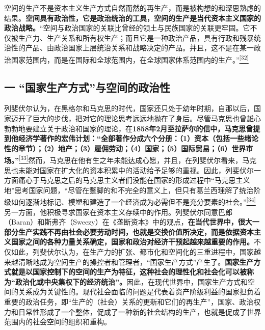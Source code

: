 \documentclass[UTF8, fontset = sourcesans, a4paper, oneside, zihao =
-4, scheme=chinese, no-math, space=true]{ctexbook}
\begin{document}
空间的生产不是资本主义生产方式自然而然的再生产，而是被构想的和深思熟虑的结果。\textbf{空间具有政治性，它是政治统治的工具，空间的生产是当代资本主义国家的政治战略。}``空间与政治国家的关联比曾经的领土与民族国家的关联更牢固。它不仅被生产力、生产关系和所有权生产；而且它是一种政治产品，具有行政和残暴统治性的产品、由政治国家上层统治关系和战略决定的产品。并且，这不是在某一政治国家范围内，而是在国际和全球范围内，在全球国家体系范围内的生产。''\protect\hypertarget{part0007_split_002.htmlux5cux23w32}{}{}\protect\hyperlink{part0007_split_004.htmlux5cux23m32}{\textsuperscript{{[}32{]}}}

\subsection{\texorpdfstring{一
``国家生产方式''与空间的政治性}{一 国家生产方式与空间的政治性}}\label{part0007_split_002.htmlux5cux23c028}

列斐伏尔认为，在黑格尔和马克思的时代，国家还只处于幼年时期，自那以后，国家迈开了巨大的步伐，把对它的理论思考远远地抛在了身后。尽管马克思也曾雄心勃勃地要建立关于政治和国家的理论，在\textbf{1858年2月至拉萨尔的信中，马克思曾提到他经济学著作的宏伟计划：``全部著作分成六个分册：（1）资本（包括一些绪论性的章节）；（2）地产；（3）雇佣劳动；（4）国家；（5）国际贸易；（6）世界市场。''}\protect\hypertarget{part0007_split_002.htmlux5cux23w33}{}{}\protect\hyperlink{part0007_split_004.htmlux5cux23m33}{\textsuperscript{{[}33{]}}}然而，马克思在他有生之年未能达成心愿，并且，在列斐伏尔看来，马克思也未能对国家在扩大化的资本积累中的活动给予足够的重视。因此，列斐伏尔一方面痛心于马克思之后的马克思主义者们没能在国家的形成过程中``马克思主义地''思考国家问题，``尽管在蹩脚的和不完全的意义上，但只有葛兰西理解了统治阶级如何逐渐地标记、模塑和建造了一个经济成为必需但不是充分要素的社会。''\protect\hypertarget{part0007_split_002.htmlux5cux23w34}{}{}\protect\hyperlink{part0007_split_004.htmlux5cux23m34}{\textsuperscript{{[}34{]}}}另一方面，他积极寻求国家在资本主义存续中的作用。列斐伏尔同意巴郎（Baran）和斯弗齐（Sweezy）在《垄断资本》中的观点，\textbf{在当代世界中，很大一部分生产实践不再由社会必要劳动时间，也就是交换价值所决定，而是依据资本主义国家之间的各种力量关系确定，国家和政治对经济干预起越来越重要的作用。}不仅如此，列斐伏尔认为，在生产力的扩张、都市化和空间化的三重进程中，国家越来越清晰地成为空间生产的操控者和管理者，``国家生产方式''产生了。\textbf{国家生产方式就是以国家控制下的空间的生产为特征，这种社会的理性化和社会化可以被称为``政治化或中央集权下的经济统治''。}因此，在现代世界中，国家生产方式和空间的关系成为关键性的。现代社会面临的问题是代表着资产阶级利益的国家担负着重要的政治任务，即``生产的（社会）关系的更新和它们的再生产''，国家、政治权力和日常性形成了一个整体，促成了一种新的社会结构的生产，也就是促成了世界范围内的社会空间的组织和重构。
\end{document}
